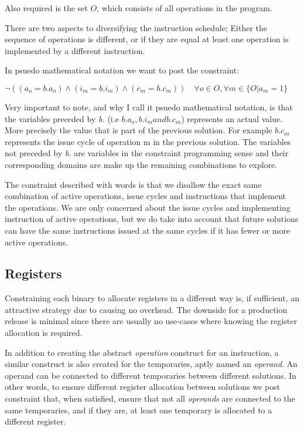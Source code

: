 \vspace{0.2cm}

Also required is the set $O$, which consists of all operations in the program.

\vspace{0.2cm}

There are two aspects to diversifying the instruction schedule; Either the sequence of
operations is different, or if they are equal at least one operation is implemented by a
different instruction.

In psuedo mathematical notation we want to post the constraint:

\vspace{0.2cm}

$\neg( (a_o = b.a_o) \land (i_m = b.i_m) \land (c_m = b.c_m) ) \quad \forall o \in O, \forall m \in \{ O | a_m = 1 \}$

\vspace{0.2cm}

Very important to note, and why I call it psuedo mathematical notation, is that the variables
preceded by \textit{b.} (i.e $b.a_o, b.i_m and b.c_m$) represents an actual value. More
precisely the value that is part of the previous solution. For example $b.c_m$ represents
the issue cycle of operation m in the previous solution. The variables not preceded by
\textit{b.} are variables in the constraint programming sense and their corresponding domains
are make up the remaining combinations to explore.

The constraint described with words is that we disallow the exact same combination of
active operations, issue cycles and instructions that implement the operations. We are
only concerned about the issue cycles and implementing instruction of active operations,
but we do take into account that future solutions can have the same instructions issued
at the same cycles if it has fewer or more active operations.


\subsection{Registers}

Constraining each binary to allocate registers in a different way is, if sufficient, an
attractive strategy due to causing no overhead. The downside for a production release is
minimal since there are usually no use-cases where knowing the register allocation is required.

In addition to creating the abstract \textit{operation} construct for an instruction, a
similar construct is also created for the temporaries, aptly named an \textit{operand}.
An operand can be connected to different temporaries between different solutions. In other
words, to ensure different register allocation between solutions we post constraint that,
when satisfied, ensure that not all \textit{operands} are connected to the same temporaries,
and if they are, at least one temporary is allocated to a different register.
